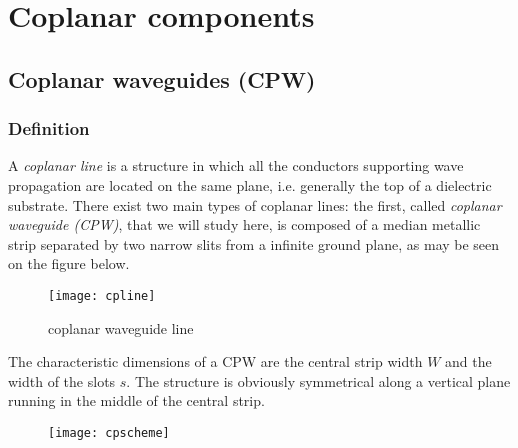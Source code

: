 %
%
%
%

\chapter{Coplanar components}

\section{Coplanar waveguides (CPW)}

\subsection{Definition}

A \emph{coplanar line} is a structure in which all the conductors
supporting wave propagation are located on the same plane,
i.e. generally the top of a dielectric substrate.  There exist two
main types of coplanar lines: the first, called \emph{coplanar
waveguide (CPW)}, that we will study here, is composed of a median
metallic strip separated by two narrow slits from a infinite ground
plane, as may be seen on the figure below.

\begin{figure}[ht]
\begin{center}
\texttt{[image: cpline]}
\end{center}
\caption{coplanar waveguide line}
\label{fig:CoplanarLine}
\end{figure}
\FloatBarrier

The characteristic dimensions of a CPW are the central strip width $W$
and the width of the slots $s$.  The structure is obviously
symmetrical along a vertical plane running in the middle of the
central strip.

\begin{figure}[ht]
\begin{center}
\texttt{[image: cpscheme]}
\end{center}
\label{fig:CoplanarScheme}
\end{figure}
\FloatBarrier

